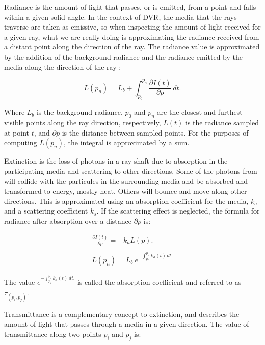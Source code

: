 \documentclass[oneside,a4paper,english,links]{amca}
\begin{document}
Radiance is the amount of light that passes, or is emitted, from a
point and falls within a given solid angle. In the context of DVR, the
media that the rays traverse are taken as emissive, so when inspecting
the amount of light received for a given ray, what we are really doing
is approximating the radiance received from a distant point along the
direction of the ray. The radiance value is approximated by the
addition of the background radiance and the radiance emitted by the
media along the direction of the ray : 

\begin{equation} \label{eq:general_radiance}  
  L(p_n) = L_b + \int_{p_0}^{p_n} \frac{\partial I(t)}{\partial p} \, dt.
\end{equation}

Where $L_b$ is the background radiance, $p_0$ and $p_n$ are the
closest and furthest visible points along the ray direction,
respectively, $L(t)$ is the radiance sampled at point $t$, and
$\partial p$ is the distance between sampled points. For the purposes
of computing $L(p_n)$, the integral is approximated by a sum.

Extinction is the loss of photons in a ray shaft due to absorption in
the participating media and scattering to other directions. Some of
the photons from  will collide with the particules in the
surrounding media and be absorbed and transformed to energy, mostly
heat. Others will bounce and move along other directions. This is
approximated using an absorption coefficient for the media, $k_a$ and
a scattering coefficient $k_s$. If the scattering effect is neglected,
the formula for radiance after absorption over a distance $\partial p$
is:

\begin{equation} \label{eq:absorption_radiance}  
  \begin{aligned}
    \frac{\partial I(t)}{\partial p} = -k_a L(p). 
    \\
    \\
    L(p_n) = L_b \ e^{-\int_{p_0}^{p_n} k_a(t) \, dt.}
  \end{aligned}
\end{equation}

The value $e^{-\int_{p_i}^{p_j} k_a(t) \, dt.}$ is called the
absorption coefficient and referred to as $\tau_{(p_i, p_j)}$.

Transmittance is a complementary concept to extinction, and describes
the amount of light that passes through a media in a given
direction. The value of transmittance along two points $p_i$ and $p_j$
is:
\end{document}
